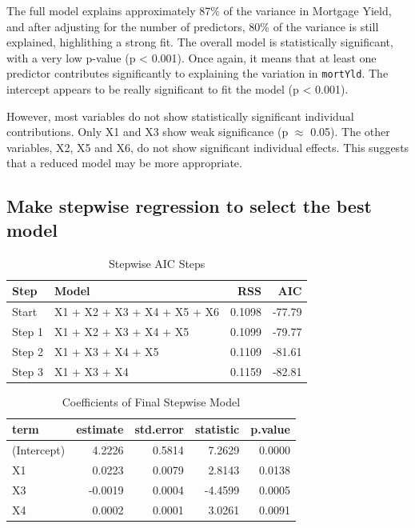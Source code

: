 \documentclass[
  11pt,
]{article}
\begin{document}
The full model explains approximately 87\% of the variance in Mortgage
Yield, and after adjusting for the number of predictors, 80\% of the
variance is still explained, highlithing a strong fit. The overall model
is statistically significant, with a very low p-value (p \textless{}
0.001). Once again, it means that at least one predictor contributes
significantly to explaining the variation in \texttt{mortYld}. The
intercept appears to be really significant to fit the model (p
\textless{} 0.001).

However, most variables do not show statistically significant individual
contributions. Only X1 and X3 show weak significance (p \(\approx\)
0.05). The other variables, X2, X5 and X6, do not show significant
individual effects. This suggests that a reduced model may be more
appropriate.

\subsection{Make stepwise regression to select the best
model}\label{make-stepwise-regression-to-select-the-best-model}

\begin{table}[!h]
\centering
\caption{\label{tab:unnamed-chunk-11}Stepwise AIC Steps}
\centering
\fontsize{8}{10}\selectfont
\begin{tabular}[t]{llrr}
\toprule
Step & Model & RSS & AIC\\
\midrule
Start & X1 + X2 + X3 + X4 + X5 + X6 & 0.1098 & -77.79\\
Step 1 & X1 + X2 + X3 + X4 + X5 & 0.1099 & -79.77\\
Step 2 & X1 + X3 + X4 + X5 & 0.1109 & -81.61\\
Step 3 & X1 + X3 + X4 & 0.1159 & -82.81\\
\bottomrule
\end{tabular}
\end{table}

\begin{table}[!h]
\centering
\caption{\label{tab:unnamed-chunk-12}Coefficients of Final Stepwise Model}
\centering
\fontsize{8}{10}\selectfont
\begin{tabular}[t]{lrrrr}
\toprule
term & estimate & std.error & statistic & p.value\\
\midrule
(Intercept) & 4.2226 & 0.5814 & 7.2629 & 0.0000\\
X1 & 0.0223 & 0.0079 & 2.8143 & 0.0138\\
X3 & -0.0019 & 0.0004 & -4.4599 & 0.0005\\
X4 & 0.0002 & 0.0001 & 3.0261 & 0.0091\\
\bottomrule
\end{tabular}
\end{table}
\end{document}
